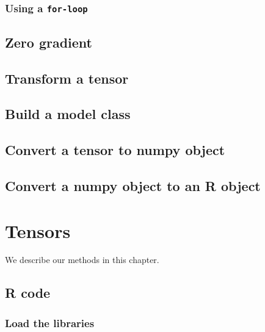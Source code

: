 \documentclass[]{book}
\begin{document}
\hypertarget{using-a-for-loop}{%
\subsection{\texorpdfstring{Using a \texttt{for-loop}}{Using a for-loop}}\label{using-a-for-loop}}

\hypertarget{zero-gradient}{%
\section{Zero gradient}\label{zero-gradient}}

\hypertarget{transform-a-tensor}{%
\section{Transform a tensor}\label{transform-a-tensor}}

\hypertarget{build-a-model-class}{%
\section{Build a model class}\label{build-a-model-class}}

\hypertarget{convert-a-tensor-to-numpy-object}{%
\section{Convert a tensor to numpy object}\label{convert-a-tensor-to-numpy-object}}

\hypertarget{convert-a-numpy-object-to-an-r-object}{%
\section{Convert a numpy object to an R object}\label{convert-a-numpy-object-to-an-r-object}}

\hypertarget{tensors}{%
\chapter{Tensors}\label{tensors}}

We describe our methods in this chapter.

\hypertarget{r-code}{%
\section{R code}\label{r-code}}

\hypertarget{load-the-libraries}{%
\subsection{Load the libraries}\label{load-the-libraries}}
\end{document}

